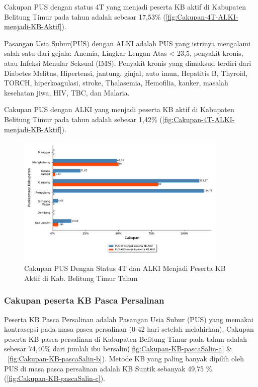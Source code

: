 Cakupan PUS dengan status 4T yang menjadi peserta KB aktif di Kabupaten Belitung Timur pada tahun \tP  adalah sebesar 17,53\% (\autoref{fig:Cakupan-4T-ALKI-menjadi-KB-Aktif}).

Pasangan Usia Subur(PUS) dengan ALKI adalah PUS yang istrinya mengalami salah satu dari gejala: Anemia, Lingkar Lengan Atas < 23,5, penyakit kronis, atau Infeksi Menular Seksual (IMS).
Penyakit kronis yang dimaksud terdiri dari Diabetes Melitus, Hipertensi, jantung, ginjal, auto imun, Hepatitis B, Thyroid, TORCH, hiperkoagulasi, stroke, Thalasemia, Hemofilia, kanker, masalah kesehatan jiwa, HIV, TBC, dan Malaria.

Cakupan PUS dengan ALKI yang menjadi peserta KB aktif di Kabupaten Belitung Timur pada tahun \tP  adalah sebesar 1,42\% (\autoref{fig:Cakupan-4T-ALKI-menjadi-KB-Aktif}).

\begin{figure}[H]
	\centering
	\includegraphics[width=0.9\textwidth]{bab_05/bab_05_06a_KB4TALKI}
	\caption{Cakupan PUS Dengan Status 4T dan ALKI Menjadi Peserta KB Aktif di Kab. Belitung Timur Tahun \tP}
	\label{fig:Cakupan-4T-ALKI-menjadi-KB-Aktif}
\end{figure}

\subsubsection{Cakupan peserta KB Pasca Persalinan}
Peserta KB Pasca Persalinan adalah Pasangan Usia Subur (PUS) yang memakai kontrasepsi pada masa pasca persalinan (0-42 hari setelah melahirkan). Cakupan peserta KB pasca persalinan di Kabupaten Belitung Timur pada tahun \tP adalah sebesar 74,40\% dari jumlah ibu bersalin(\autoref{fig:Cakupan-KB-pascaSalin-a} \& ~\autoref{fig:Cakupan-KB-pascaSalin-b}). Metode KB yang paling banyak dipilih oleh PUS di masa pasca persalinan adalah KB Suntik sebanyak 49,75 \% (\autoref{fig:Cakupan-KB-pascaSalin-c}).

